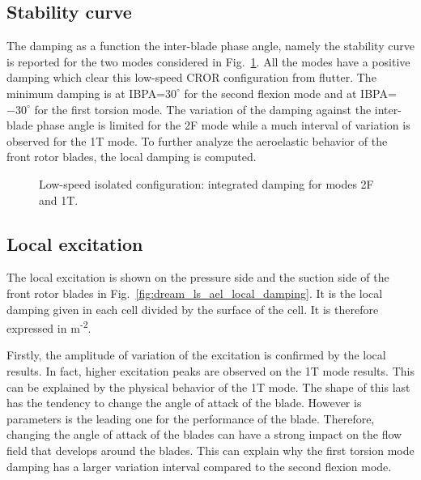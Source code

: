 
\subsection{Stability curve}
\label{sub:dream_ls_ael_curve}

The damping as a function the inter-blade phase angle, namely the stability
curve is reported for the two modes considered in Fig.~\ref{fig:dream_ls_ael_damping}.
All the modes have a positive damping which clear this low-speed CROR configuration
from flutter. The minimum damping is at IBPA=$30^\circ$ for the second flexion
mode and at IBPA=$-30^\circ$ for the first torsion mode.
The variation of the damping against the inter-blade phase angle is
limited for the 2F mode while a much interval of variation is
observed for the 1T mode. To further analyze the aeroelastic behavior
of the front rotor blades, the local damping is computed.
\begin{figure}[htp]
  \centering
  \caption{Low-speed isolated configuration: integrated damping for modes 2F and 1T.}
  \label{fig:dream_ls_ael_damping}
\end{figure}

\subsection{Local excitation}
\label{sub:dream_ls_ael_local_damping}

The local excitation is shown on the pressure side and
the suction side of the front rotor blades in 
Fig.~\ref{fig:dream_ls_ael_local_damping}. It is the
local damping given in each cell divided by the 
surface of the cell. It is therefore expressed in
m\textsuperscript{-2}.

Firstly, the amplitude of variation of the excitation
is confirmed by the local results. In fact, higher excitation peaks
are observed on the 1T mode results. This can be explained
by the physical behavior of the 1T mode. The shape of this last
has the tendency to change the angle of attack of the blade.
However is parameters is the leading one for the
performance of the blade. Therefore, changing the angle of attack
of the blades can have a strong impact on the flow field
that develops around the blades. This can explain why the
first torsion mode damping has a larger variation interval
compared to the second flexion mode.

